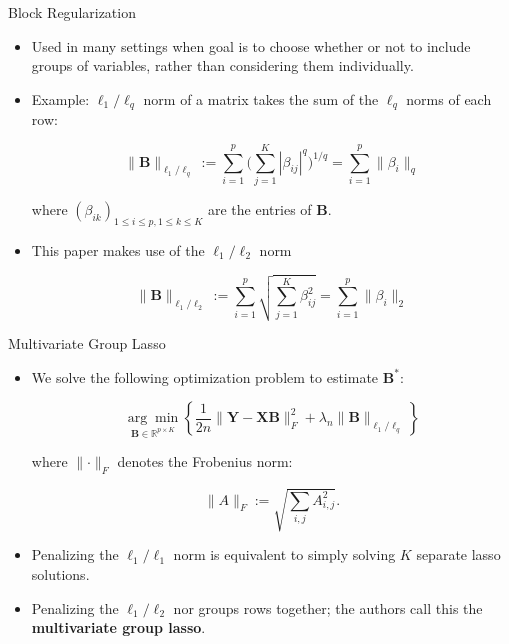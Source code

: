 \documentclass[notes]{beamer}       %
\begin{document}
\begin{frame}{Block Regularization}{}
  \begin{itemize}
  \item {
    Used in many settings when goal is to choose whether or not to include groups of variables, rather than considering them individually.
  }
%   
%

  \item{Example: \(\ell_1/\ell_q\) norm of a matrix takes the sum of the \(\ell_q\) norms of each row:
  
  \begin{equation}
  \lVert \boldsymbol{B} \rVert_{\ell_1/\ell_q} := \sum_{i=1}^p \Bigg( \sum_{j=1}^K |\beta_{ij}|^q \Bigg)^{1/q} = \sum_{i=1}^p \lVert \beta_i \rVert_q
  \end{equation}
  
  where \((\beta_{ik})_{1 \leq i \leq p, 1 \leq k \leq K}\) are the entries of \(\boldsymbol{B}\).
  
  }
  \item{This paper makes use of the \(\ell_1/\ell_2\) norm
  
    \begin{equation}
  \lVert \boldsymbol{B} \rVert_{\ell_1/\ell_2} := \sum_{i=1}^p \sqrt{ \sum_{j=1}^K \beta_{ij}^2 } = \sum_{i=1}^p \lVert \beta_i \rVert_2
  \end{equation}
  }
  \end{itemize}
\end{frame}

\begin{frame}{Multivariate Group Lasso}{}
  \begin{itemize}
  \item{We solve the following optimization problem to estimate \(\boldsymbol{B}^*\):
   
   \begin{equation}\label{linreg.pres.mult.group.lasso.opt.problem}
   \underset{\boldsymbol{B} \in \mathbb{R}^{p \times K}} {\arg \min}\left\{  \frac{1}{2n} \lVert \boldsymbol{Y} - \boldsymbol{X} \boldsymbol{B} \rVert_F^2 + \lambda_n \lVert \boldsymbol{B} \rVert _{\ell_1/\ell_q}\right\}
   \end{equation}
   
   where \(\lVert \cdot \rVert_F\) denotes the Frobenius norm:
   
   \[
   \lVert A \rVert_F := \sqrt{ \sum_{i,j} A_{i,j}^2}.
   \]
  }


  \item{Penalizing the \(\ell_1/\ell_1\) norm is equivalent to simply solving \(K\) separate lasso solutions.
  

  }
  \item{Penalizing the \(\ell_1/\ell_2\) nor groups rows together; the authors call this the \textbf{multivariate group lasso}.
  }
  \end{itemize}
\end{frame}
\end{document}
